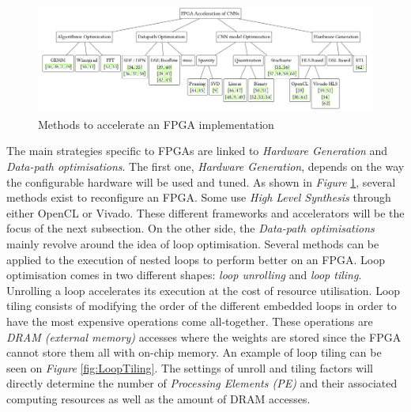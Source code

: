 \begin{figure}[htbp]
	\centering
		\includegraphics[width=\textwidth]{Figures/InferenceOpt.png}
	\caption[Inference Optimisations]{Methods to accelerate an FPGA implementation \cite{Abdelouahab2018}}
	\label{fig:InferenceOpt}
\end{figure}

The main strategies specific to FPGAs are linked to \emph{Hardware Generation} and \emph{Data-path optimisations}. The first one, \emph{Hardware Generation}, depends on the way the configurable hardware will be used and tuned. As shown in \emph{Figure} \ref{fig:InferenceOpt}, several methods exist to reconfigure an FPGA. Some use \emph{High Level Synthesis} through either OpenCL or Vivado. These different frameworks and accelerators will be the focus of the next subsection. On the other side, the \emph{Data-path optimisations} mainly revolve around the idea of loop optimisation. Several methods can be applied to the execution of nested loops to perform better on an FPGA. Loop optimisation comes in two different shapes: \emph{loop unrolling} and \emph{loop tiling}. Unrolling a loop accelerates its execution at the cost of resource utilisation. Loop tiling consists of modifying the order of the different embedded loops in order to have the most expensive operations come all-together. These operations are \emph{DRAM (external memory)} accesses where the weights are stored since the FPGA cannot store them all with on-chip memory. An example of loop tiling can be seen on \emph{Figure} \ref{fig:LoopTiling}. The settings of unroll and tiling factors will directly determine the number of \emph{Processing Elements (PE)} and their associated computing resources as well as the amount of DRAM accesses.

